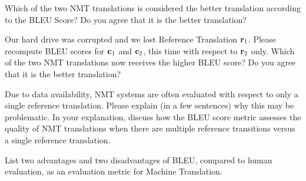 \begin{parts}
\begin{subparts}
        Which of the two NMT translations is considered the better translation according to the BLEU Score? Do you agree that it is the better translation?
        
        \ifans{}
        
        \subpart[5] Our hard drive was corrupted and we lost Reference Translation $\mathbf{r}_1$. Please recompute BLEU scores for $\mathbf{c}_1$ and $\mathbf{c}_2$, this time with respect to $\mathbf{r}_2$ only. Which of the two NMT translations now receives the higher BLEU score? Do you agree that it is the better translation?
        
        \ifans{}
        
        \subpart[2] Due to data availability, NMT systems are often evaluated with respect to only a single reference translation. Please explain (in a few sentences) why this may be problematic. In your explanation, discuss how the BLEU score metric assesses the quality of NMT translations when there are multiple reference transitions versus a single reference translation.
        
        \ifans{}
        
        \subpart[2] List two advantages and two disadvantages of BLEU, compared to human evaluation, as an evaluation metric for Machine Translation. 
        
        \ifans{}
        
    \end{subparts}
\end{parts}
